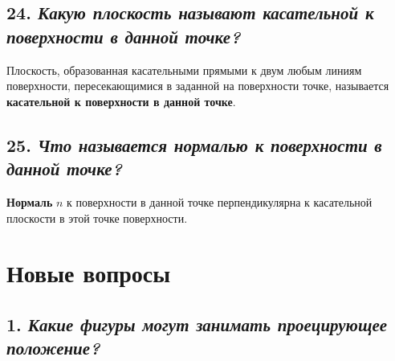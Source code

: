 \newpage
\subsection*{24. \textit{Какую плоскость называют касательной к поверхности в данной точке?}}

\begin{mainQuote}
    
\end{mainQuote}

Плоскость, образованная касательными прямыми к двум любым линиям поверхности, пересекающимися в заданной на поверхности точке, называется {\bf касательной к поверхности в данной точке}.



\newpage
\subsection*{25. \textit{Что называется нормалью к поверхности в данной точке?}}

\begin{mainQuote}
    
\end{mainQuote}

{\bf Нормаль} $n$ к поверхности в данной точке перпендикулярна к касательной плоскости в этой точке поверхности.


\newpage
\section*{\textbf{Новые вопросы}}
\subsection*{1. \textit{Какие фигуры могут занимать проецирующее положение?}}
\begin{mainQuote}
\end{mainQuote}

